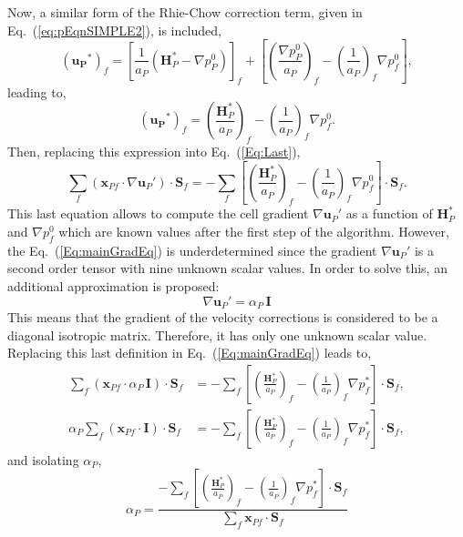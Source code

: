 \documentclass[final,3p,times,11pt,onecolumn]{myElsarticle}
\numberwithin{equation}{section}
\begin{document}
Now, a similar form of the Rhie-Chow correction term, given in Eq.~(\ref{eq:pEqnSIMPLE2}), is included,
\begin{equation}
\left(
\boldsymbol{u_P}^{*}
\right)_{f}
=
\left[\frac{1}{a_P}\left(\boldsymbol{H}_P^* - \nabla p_P^{0}\right)\right]_f
+
\left[
\left(
\frac{\nabla p_P^{0}}{a_P}
\right)_f
- 
\left(
\frac{1}{a_P}
\right)_f 
\nabla p_f^{0} 
\right],
\end{equation}
leading to, 
\begin{equation}
\left(
\boldsymbol{u_P}^{*}
\right)_{f}
=
 \left(\frac{\boldsymbol{H}_P^*}{a_P}\right)_f 
 -
 \left(\frac{1}{a_P}\right)_f \nabla p_f^{0}.
\end{equation}
Then, replacing this expression into Eq.~(\ref{Eq:Last}),
\begin{equation}
\label{Eq:mainGradEq}
\sum_f 
\left(
\boldsymbol{x}_{Pf}
\cdot 
\nabla \boldsymbol{u}_P'
\right)
\cdot 
\boldsymbol{S}_f
=
-\sum_f
\left[
\left(\frac{\boldsymbol{H}_P^*}{a_P}\right)_f 
 -
 \left(\frac{1}{a_P}\right)_f \nabla p_f^{0}
 \right]
\cdot 
\boldsymbol{S}_f.
\end{equation}
This last equation allows to compute the cell gradient $\nabla \boldsymbol{u}_P'$ as a function of $\boldsymbol{H}_P^*$ and $\nabla p_f^{0}$ which are known values after the first step of the algorithm. However, the Eq.~(\ref{Eq:mainGradEq}) is underdetermined since the gradient $\nabla \boldsymbol{u}_P'$ is a second order tensor with nine unknown scalar values. In order to solve this, an additional approximation is proposed: 
\begin{equation}
\nabla \boldsymbol{u}_P'
=
\alpha_P\,
\boldsymbol{I}
\label{eq:gradApprox}
\end{equation}
This means that the gradient of the velocity corrections is considered to be a diagonal isotropic matrix. Therefore, it has only one unknown scalar value.
Replacing this last definition in Eq.~(\ref{Eq:mainGradEq}) leads to,
\begin{align}
\sum_f 
\left(
\boldsymbol{x}_{Pf}
\cdot 
\alpha_P\,
\boldsymbol{I}
\right)
\cdot 
\boldsymbol{S}_f
&=
-\sum_f
\left[
\left(\frac{\boldsymbol{H}_P^*}{a_P}\right)_f 
 -
 \left(\frac{1}{a_P}\right)_f \nabla p_f^{*}
 \right]
\cdot 
\boldsymbol{S}_f,
\\
\alpha_P
\sum_f 
\left(
\boldsymbol{x}_{Pf}
\cdot 
\boldsymbol{I}
\right)
\cdot 
\boldsymbol{S}_f
&=
-\sum_f
\left[
\left(\frac{\boldsymbol{H}_P^*}{a_P}\right)_f 
 -
 \left(\frac{1}{a_P}\right)_f \nabla p_f^{*}
 \right]
\cdot 
\boldsymbol{S}_f,
\end{align}
and isolating $\alpha_P$,
\begin{equation}
\alpha_P
=
\dfrac
{-\sum_f
\left[
\left(\frac{\boldsymbol{H}_P^*}{a_P}\right)_f 
 -
 \left(\frac{1}{a_P}\right)_f \nabla p_f^{*}
 \right]
\cdot 
\boldsymbol{S}_f}
{\sum_f 
\boldsymbol{x}_{Pf}
\cdot 
\boldsymbol{S}_f}
\end{equation}
\end{document}
